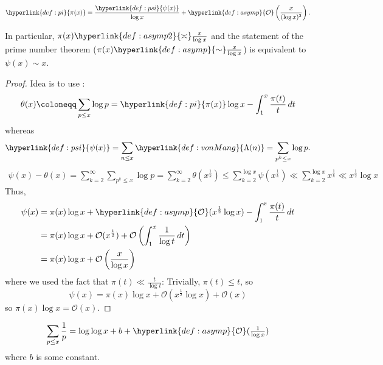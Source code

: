 \documentclass{article}
\newcommand{\bigO}{\mathcal{O}}
\begin{document}
\begin{nlemma}\label{lem:8}
  \newlec
  \begin{equation*}
    \hyperlink{def:pi}{\pi(x)} = \frac{\hyperlink{def:psi}{\psi(x)}}{\log x} + \hyperlink{def:asymp}{\bigO}\left(\frac{x}{(\log x)^2}\right).
  \end{equation*}
\end{nlemma}
In particular, $\pi(x) \hyperlink{def:asymp2}{\asymp} \frac{x}{\log x}$ and the statement of the prime number theorem ($\pi(x) \hyperlink{def:asymp}{\sim} \frac{x}{\log x}$) is equivalent to $\psi(x) \sim x$.
\begin{proof}
  Idea is to use :
  \begin{equation*}
    \theta(x) \coloneqq \sum_{p \leq x} \log p = \hyperlink{def:pi}{\pi(x)} \log x - \int_1^x \frac{\pi(t)}{t} \, dt
  \end{equation*}
  whereas
  \begin{equation*}\hyperlink{def:psi}{\psi(x)} = \sum_{n \leq x} \hyperlink{def:vonMang}{\Lambda(n)} = \sum_{p^k \leq x} \log p.\end{equation*}
  \begin{align*}
    \psi(x) - \theta(x) = \sum_{k=2}^\infty \sum_{p^k \leq x} \log p = \sum_{k=2}^\infty \theta(x^{\frac{1}{k}}) \leq \sum_{k=2}^{\log x} \psi(x^{\frac{1}{k}}) \ll \sum_{k=2}^{\log x} x^{\frac{1}{k}} \ll x^{\frac{1}{2}} \log x
  \end{align*}
  Thus,
  \begin{align*}
    \psi(x) &= \pi(x) \log x + \hyperlink{def:asymp}{\bigO}(x^{\frac{1}{2}} \log x) - \int_1^x \frac{\pi(t)}{t} \, dt \\
            &= \pi(x) \log x + \bigO(x^{\frac{1}{2}}) + \bigO\left(\int_1^x \frac{1}{\log t} \, dt\right) \\
            &= \pi(x) \log x + \bigO\left(\frac{x}{\log x}\right)
  \end{align*}
  where we used the fact that $\pi(t) \ll \frac{t}{\log t}$:
  Trivially, $\pi(t) \leq t$, so
  \begin{equation*}
    \psi(x) = \pi(x) \log x + \bigO(x^{\frac{1}{2}} \log x) + \bigO(x)
  \end{equation*}
  so $\pi(x) \log x = \bigO(x)$.
\end{proof}
\begin{nlemma}\label{lem:9}
  \begin{equation*}
    \sum_{p \leq x} \frac{1}{p} = \log \log x + b + \hyperlink{def:asymp}{\bigO}(\tfrac{1}{\log x})
  \end{equation*}
  where $b$ is some constant.
\end{nlemma}
\end{document}
